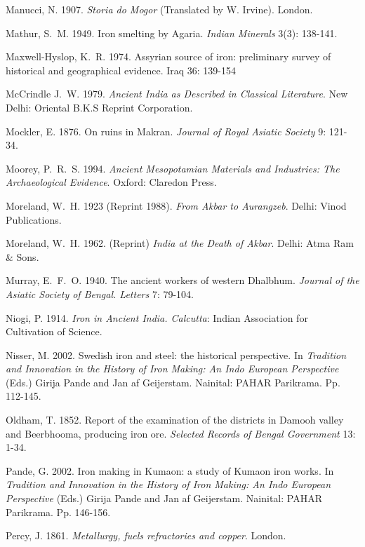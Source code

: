\begin{thebibliography}{99}
 Manucci, N. 1907. \textit{Storia do Mogor} (Translated by W. Irvine). London.

 Mathur, S.~M. 1949. Iron smelting by Agaria. \textit{Indian Minerals} 3(3): 138-141.

 Maxwell-Hyslop, K.~R. 1974. Assyrian source of iron: preliminary survey of historical and geographical evidence. Iraq 36: 139-154

 McCrindle J.~W. 1979. \textit{Ancient India as Described in Classical Literature}. New Delhi: Oriental B.K.S Reprint Corporation.

 Mockler, E. 1876. On ruins in Makran. \textit{Journal of Royal Asiatic Society} 9: 121-34.

 Moorey, P.~R.~S. 1994. \textit{Ancient Mesopotamian Materials and Industries: The Archaeological Evidence}. Oxford: Claredon Press. 

 Moreland, W.~H. 1923 (Reprint 1988). \textit{From Akbar to Aurangzeb}. Delhi: Vinod Publications.

 Moreland, W.~H. 1962. (Reprint) \textit{India at the Death of Akbar}. Delhi: Atma Ram \& Sons. 

 Murray, E.~F.~O. 1940. The ancient workers of western Dhalbhum. \textit{Journal of the Asiatic Society of Bengal. Letters} 7: 79-104.

 Niogi, P. 1914. \textit{Iron in Ancient India. Calcutta}: Indian Association for Cultivation of Science.

 Nisser, M. 2002. Swedish iron and steel: the historical perspective. In \textit{Tradition and Innovation in the History of Iron Making: An Indo European Perspective} (Eds.) Girija Pande and Jan af Geijerstam.  Nainital: PAHAR Parikrama. Pp. 112-145.

 Oldham, T. 1852. Report of the examination of the districts in Damooh valley and Beerbhooma, producing iron ore. \textit{Selected Records of Bengal Government} 13: 1-34.

 Pande, G. 2002. Iron making in Kumaon: a study of Kumaon iron works. In \textit{Tradition and Innovation in the History of Iron Making: An Indo European Perspective} (Eds.) Girija Pande and Jan af Geijerstam.  Nainital: PAHAR Parikrama. Pp. 146-156. 

 Percy, J. 1861. \textit{Metallurgy, fuels refractories and copper}. London. 


\end{thebibliography}
